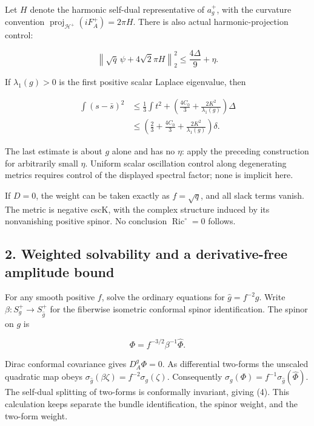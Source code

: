 \documentclass[
  11pt,
]{article}
\begin{document}
Let \(H\) denote the harmonic self-dual representative of \(a_g^+\),
with the curvature convention
\(\operatorname{proj}_{\mathcal H^+}(iF_A^+)=2\pi H\). There is also
actual harmonic-projection control:

\[
 \left\|\sqrt q\,\psi+4\sqrt2\pi H\right\|_2^2
 \le\frac{4\Delta}{9}+\eta.
 \tag{10}
\]

If \(\lambda_1(g)>0\) is the first positive scalar Laplace eigenvalue,
then

\[
\begin{aligned}
 \int(s-\bar s)^2
 &\le\frac13\int t^2+
       \left(\frac{4C_0}{3}+\frac{2K^2}{\lambda_1(g)}\right)\Delta\\
 &\le\left(\frac23+\frac{4C_0}{3}
                   +\frac{2K^2}{\lambda_1(g)}\right)\delta.
\end{aligned}
\tag{11}
\]

The last estimate is about \(g\) alone and has no \(\eta\): apply the
preceding construction for arbitrarily small \(\eta\). Uniform scalar
oscillation control along degenerating metrics requires control of the
displayed spectral factor; none is implicit here.

If \(D=0\), the weight can be taken exactly as \(f=\sqrt q\), and all
slack terms vanish. The metric is negative cscK, with the complex
structure induced by its nonvanishing positive spinor. No conclusion
\(\operatorname{Ric}^{\circ}=0\) follows.

\hypertarget{weighted-solvability-and-a-derivative-free-amplitude-bound}{%
\subsection{2. Weighted solvability and a derivative-free amplitude
bound}\label{weighted-solvability-and-a-derivative-free-amplitude-bound}}

For any smooth positive \(f\), solve the ordinary equations for
\(\widehat g=f^{-2}g\). Write \(\beta:S_g^+\to S_{\widehat g}^+\) for
the fiberwise isometric conformal spinor identification. The spinor on
\(g\) is

\[
 \Phi=f^{-3/2}\beta^{-1}\widehat\Phi.
 \tag{12}
\]

Dirac conformal covariance gives \(D_A^g\Phi=0\). As differential
two-forms the unscaled quadratic map obeys
\(\sigma_{\widehat g}(\beta\zeta)=f^{-2}\sigma_g(\zeta)\). Consequently
\(\sigma_g(\Phi)=f^{-1}\sigma_{\widehat g}(\widehat\Phi)\). The
self-dual splitting of two-forms is conformally invariant, giving (4).
This calculation keeps separate the bundle identification, the spinor
weight, and the two-form weight.
\end{document}
